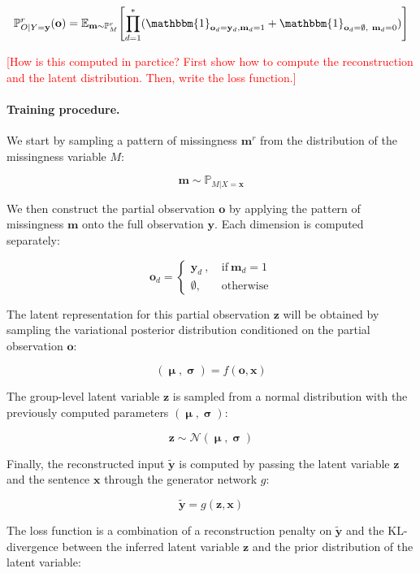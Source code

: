 \documentclass[a4paper,12pt,twoside,openright]{article}
\newcommand{\crit}[1]{\textcolor{red}{#1}}
\begin{document}
\[
    \mathbb{P}^r_{O|Y=\mathbf{y}} (\mathbf{o}) = \mathbb{E}_{\mathbf{m} \sim \mathbb{P}^r_M} \Biggl[ \prod_{d=1}^* (\mathbbm{1}_{\mathbf{o}_d = \mathbf{y}_d, \mathbf{m}_d = 1} + \mathbbm{1}_{\mathbf{o}_d = \emptyset, ~ \mathbf{m}_d = 0}) \Biggr]
\]

\crit{[How is this computed in parctice? First show how to compute the reconstruction and the latent distribution. Then, write the loss function.]}

\paragraph{Training procedure.} We start by sampling a pattern of missingness $\mathbf{m}^r$ from the distribution of the missingness variable $M$:

\[
    \mathbf{m} \sim \mathbb{P}_{M | X = \mathbf{x}}
\]

We then construct the partial observation $\mathbf{o}$ by applying the pattern of missingness $\mathbf{m}$ onto the full observation $\mathbf{y}$. Each dimension is computed separately:

\[
    \mathbf{o}_{d} = \left\{\begin{array}{ll} \mathbf{y}_{d} ~ , ~ &\text{if} ~ \mathbf{m}_{d} = 1 \\ \emptyset, &\text{otherwise} \end{array}\right.
\]

The latent representation for this partial observation $\mathbf{z}$ will be obtained by sampling the variational posterior distribution conditioned on the partial observation $\mathbf{o}$:

\[
    (\boldsymbol{\upmu}, \boldsymbol{\upsigma}) = f(\mathbf{o}, \mathbf{x})
\]

The group-level latent variable $\mathbf{z}$ is sampled from a normal distribution with the previously computed parameters $(\boldsymbol{\upmu}, \boldsymbol{\upsigma})$:

\[
    \mathbf{z} \sim \mathcal{N}(\boldsymbol{\upmu}, \boldsymbol{\upsigma})
\]

Finally, the reconstructed input $\tilde{\mathbf{y}}$ is computed by passing the latent variable $\mathbf{z}$ and the sentence $\mathbf{x}$ through the generator network $g$:

\[
    \tilde{\mathbf{y}} = g(\mathbf{z}, \mathbf{x})
\]

The loss function is a combination of a reconstruction penalty on $\tilde{\mathbf{y}}$ and the $\mathrm{KL}$-divergence between the inferred latent variable $\mathbf{z}$ and the prior distribution of the latent variable:
\end{document}
